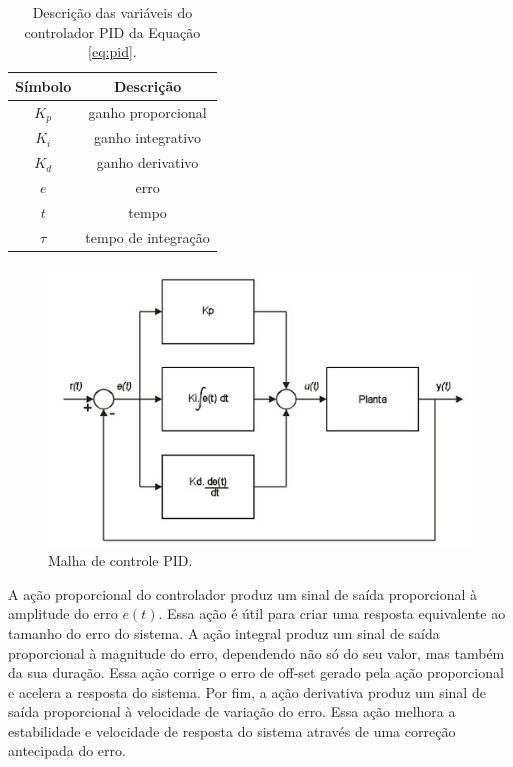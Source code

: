 \begin{table}[H]
    \begin{center}
        \begin{tabular}{ |c|c| } 
            \hline
            Símbolo   &  Descrição  \\
            \hline
            \(K_p\)   &  ganho proporcional  \\
            \hline
            \(K_i\)   &  ganho integrativo  \\
            \hline
            \(K_d\)   &  ganho derivativo  \\
            \hline
            \(e\)   &  erro  \\
            \hline
            \(t\)   &  tempo  \\
            \hline
            \(\tau\)   &  tempo de integração \\
            \hline
        \end{tabular}
        \caption{\label{tab:variaveis_pid}Descrição das variáveis do controlador PID da Equação \ref{eq:pid}.}
    \end{center}
\end{table}

\begin{figure}[h]
    \centering
    \includegraphics[scale=0.60]{figuras/implementacao/hardware/pid.jpg}
    \caption{Malha de controle PID.}
    \label{fig:pid}
\end{figure}


A ação proporcional do controlador produz um sinal de saída proporcional à amplitude do erro $e(t)$. Essa ação é útil para criar uma resposta equivalente ao tamanho do erro do sistema. A ação integral produz um sinal de saída proporcional à magnitude do erro, dependendo não só do seu valor, mas também da sua duração. Essa ação corrige o erro de off-set gerado pela ação proporcional e acelera a resposta do sistema. Por fim, a ação derivativa produz um sinal de saída proporcional à velocidade de variação do erro. Essa ação melhora a estabilidade e velocidade de resposta do sistema através de uma correção antecipada do erro. 



